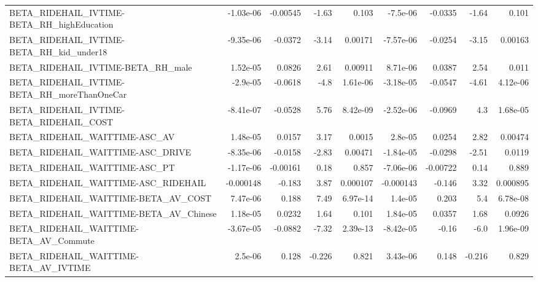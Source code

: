 \begin{tabular}{lrrrrrrrr}
BETA\_RIDEHAIL\_IVTIME-BETA\_RH\_highEducation         &   -1.03e-06 &     -0.00545 &     -1.63 &    0.103 &   -7.5e-06 &     -0.0335 &        -1.64 &         0.101 \\
BETA\_RIDEHAIL\_IVTIME-BETA\_RH\_kid\_under18           &   -9.35e-06 &      -0.0372 &     -3.14 &  0.00171 &  -7.57e-06 &     -0.0254 &        -3.15 &       0.00163 \\
BETA\_RIDEHAIL\_IVTIME-BETA\_RH\_male                  &    1.52e-05 &       0.0826 &      2.61 &  0.00911 &   8.71e-06 &      0.0387 &         2.54 &         0.011 \\
BETA\_RIDEHAIL\_IVTIME-BETA\_RH\_moreThanOneCar        &    -2.9e-05 &      -0.0618 &      -4.8 & 1.61e-06 &  -3.18e-05 &     -0.0547 &        -4.61 &      4.12e-06 \\
BETA\_RIDEHAIL\_IVTIME-BETA\_RIDEHAIL\_COST            &   -8.41e-07 &      -0.0528 &      5.76 & 8.42e-09 &  -2.52e-06 &     -0.0969 &          4.3 &      1.68e-05 \\
BETA\_RIDEHAIL\_WAITTIME-ASC\_AV                      &    1.48e-05 &       0.0157 &      3.17 &   0.0015 &    2.8e-05 &      0.0254 &         2.82 &       0.00474 \\
BETA\_RIDEHAIL\_WAITTIME-ASC\_DRIVE                   &   -8.35e-06 &      -0.0158 &     -2.83 &  0.00471 &  -1.84e-05 &     -0.0298 &        -2.51 &        0.0119 \\
BETA\_RIDEHAIL\_WAITTIME-ASC\_PT                      &   -1.17e-06 &     -0.00161 &      0.18 &    0.857 &  -7.06e-06 &    -0.00722 &         0.14 &         0.889 \\
BETA\_RIDEHAIL\_WAITTIME-ASC\_RIDEHAIL                &   -0.000148 &       -0.183 &      3.87 & 0.000107 &  -0.000143 &      -0.146 &         3.32 &      0.000895 \\
BETA\_RIDEHAIL\_WAITTIME-BETA\_AV\_COST                &    7.47e-06 &        0.188 &      7.49 & 6.97e-14 &    1.4e-05 &       0.203 &          5.4 &      6.78e-08 \\
BETA\_RIDEHAIL\_WAITTIME-BETA\_AV\_Chinese             &    1.18e-05 &       0.0232 &      1.64 &    0.101 &   1.84e-05 &      0.0357 &         1.68 &        0.0926 \\
BETA\_RIDEHAIL\_WAITTIME-BETA\_AV\_Commute             &   -3.67e-05 &      -0.0882 &     -7.32 & 2.39e-13 &  -8.42e-05 &       -0.16 &         -6.0 &      1.96e-09 \\
BETA\_RIDEHAIL\_WAITTIME-BETA\_AV\_IVTIME              &     2.5e-06 &        0.128 &    -0.226 &    0.821 &   3.43e-06 &       0.148 &       -0.216 &         0.829 \\

\end{tabular}
